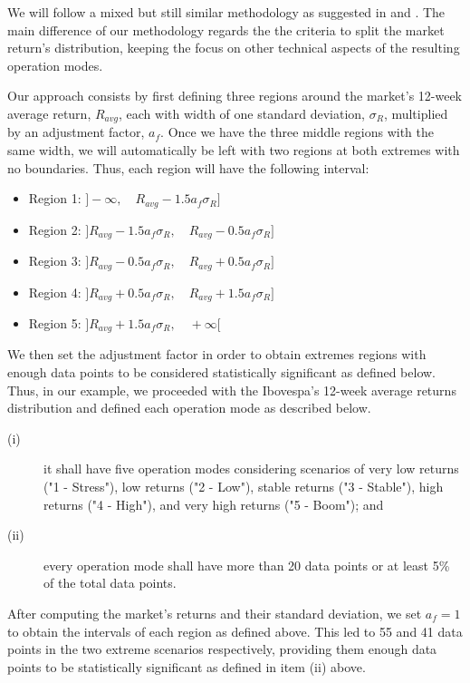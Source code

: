 We will follow a mixed but still similar methodology as suggested in \cite{smith0000} and \cite{smith0000}. The main difference of our methodology regards the the criteria to split the market return's distribution, keeping the focus on other technical aspects of the resulting operation modes.

Our approach consists by first defining three regions around the market's 12-week average return, $R_{avg}$, each with width of one standard deviation, $\sigma_R$, multiplied by an adjustment factor, $a_f$. Once we have the three middle regions with the same width, we will automatically be left with two regions at both extremes with no boundaries. Thus, each region will have the following interval:
%
\begin{itemize}
    \item Region 1: $]-\infty ,\quad R_{avg} - 1.5 a_f \sigma_R]$
    \item Region 2: $]R_{avg} - 1.5 a_f \sigma_R ,\quad R_{avg} - 0.5 a_f \sigma_R]$
    \item Region 3: $]R_{avg} - 0.5 a_f \sigma_R ,\quad R_{avg} + 0.5 a_f \sigma_R]$
    \item Region 4: $]R_{avg} + 0.5 a_f \sigma_R ,\quad R_{avg} + 1.5 a_f \sigma_R]$
    \item Region 5: $]R_{avg} + 1.5 a_f \sigma_R ,\quad +\infty[$
\end{itemize}

We then set the adjustment factor in order to obtain extremes regions with enough data points to be considered statistically significant as defined below. Thus, in our example, we proceeded with the Ibovespa's 12-week average returns distribution and defined each operation mode as described below.
%
\begin{description}
    \item[(i)] it shall have five operation modes considering scenarios of very low returns ("1 - Stress"), low returns ("2 - Low"), stable returns ("3 - Stable"), high returns ("4 - High"), and very high returns ("5 - Boom"); and
    \item[(ii)] every operation mode shall have more than 20 data points or at least 5\% of the total data points.
\end{description}

After computing the market's returns and their standard deviation, we set $a_f=1$ to obtain the intervals of each region as defined above. This led to 55 and 41 data points in the two extreme scenarios respectively, providing them enough data points to be statistically significant as defined in item (ii) above.

